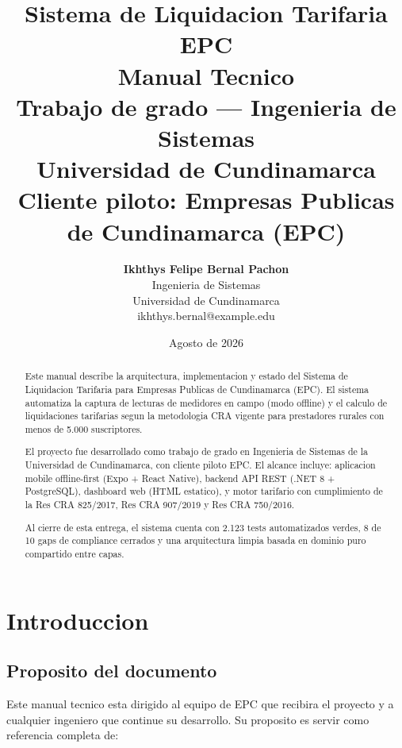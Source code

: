 \documentclass[11pt,a4paper,oneside]{report}
\title{
    \vspace{-2cm}
    \Huge \textbf{Sistema de Liquidacion Tarifaria EPC} \\[0.5cm]
    \LARGE \textbf{Manual Tecnico} \\[1cm]
    \normalsize Trabajo de grado --- Ingenieria de Sistemas \\[0.3cm]
    \normalsize Universidad de Cundinamarca \\[0.3cm]
    \normalsize Cliente piloto: Empresas Publicas de Cundinamarca (EPC)
}
\author{
    \Large \textbf{Ikhthys Felipe Bernal Pachon} \\[0.5cm]
    \normalsize Ingenieria de Sistemas \\
    \normalsize Universidad de Cundinamarca \\
    \normalsize ikhthys.bernal@example.edu \\ %
}
\date{Agosto de 2026}
\begin{document}
\maketitle

\thispagestyle{empty}


\begin{abstract}
\noindent
Este manual describe la arquitectura, implementacion y estado del Sistema de Liquidacion Tarifaria para Empresas Publicas de Cundinamarca (EPC). El sistema automatiza la captura de lecturas de medidores en campo (modo offline) y el calculo de liquidaciones tarifarias segun la metodologia CRA vigente para prestadores rurales con menos de 5.000 suscriptores.

\noindent
El proyecto fue desarrollado como trabajo de grado en Ingenieria de Sistemas de la Universidad de Cundinamarca, con cliente piloto EPC. El alcance incluye: aplicacion mobile offline-first (Expo + React Native), backend API REST (.NET 8 + PostgreSQL), dashboard web (HTML estatico), y motor tarifario con cumplimiento de la Res CRA 825/2017, Res CRA 907/2019 y Res CRA 750/2016.

\noindent
Al cierre de esta entrega, el sistema cuenta con 2.123 tests automatizados verdes, 8 de 10 gaps de compliance cerrados y una arquitectura limpia basada en dominio puro compartido entre capas.
\end{abstract}

\tableofcontents
\listoftables
\listoffigures

\newpage


\chapter{Introduccion}

\section{Proposito del documento}

Este manual tecnico esta dirigido al equipo de EPC que recibira el proyecto y a cualquier ingeniero que continue su desarrollo. Su proposito es servir como referencia completa de:
\end{document}
